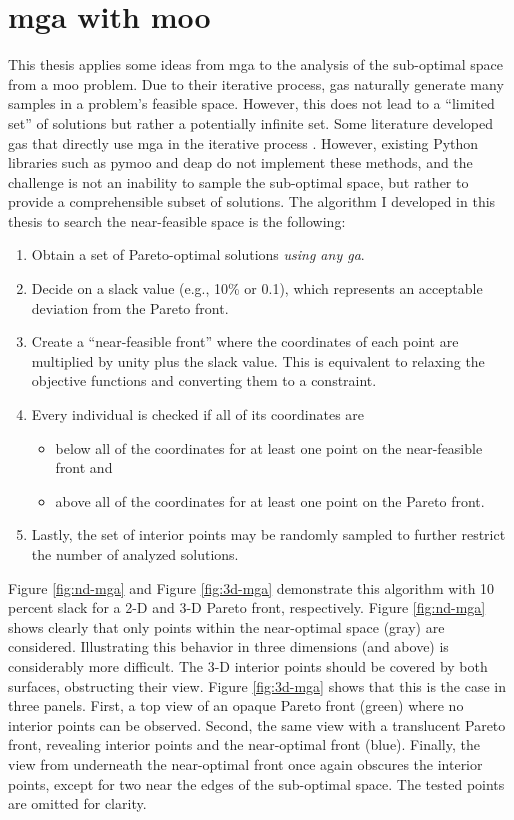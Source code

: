 \section{\acs{mga} with \acl{moo}}
\label{section:mga-moo}

This thesis applies some ideas from \ac{mga} to the analysis of the sub-optimal
space from a \acl{moo} problem. Due to their iterative process, \acp{ga}
naturally generate many samples in a problem's feasible space. However, this
does not lead to a ``limited set'' of solutions but rather a potentially
infinite set. Some literature developed \acp{ga} that directly use \ac{mga} in
the iterative process
\cite{zechman_evolutionary_2004,zechman_evolutionary_2013}. However, existing
Python libraries such as \ac{pymoo} and \ac{deap} do not implement these
methods, and the challenge is not an inability to sample the sub-optimal space,
but rather to provide a comprehensible subset of solutions. The algorithm I
developed in this thesis to search the near-feasible space is the following:

\begin{enumerate}
    \item Obtain a set of Pareto-optimal solutions \textit{using any \ac{ga}}.
    \item Decide on a slack value (e.g., 10\% or 0.1), which represents an
    acceptable deviation from the Pareto front.
    \item Create a ``near-feasible front'' where the coordinates of each point
    are multiplied by unity plus the slack value. This is equivalent to relaxing
    the objective functions and converting them to a constraint. 
    \item Every individual is checked if all of its coordinates are
    \begin{itemize}
        \item below all of the coordinates for at least one point on the
        near-feasible front and
        \item above all of the coordinates for at least one point on the Pareto
        front.
    \end{itemize}  
    \item Lastly, the set of interior points may be randomly sampled to further
    restrict the number of analyzed solutions.
\end{enumerate}
\noindent
Figure \ref{fig:nd-mga} and Figure \ref{fig:3d-mga} demonstrate this algorithm
with 10 percent slack for a 2-D and 3-D Pareto front, respectively. Figure
\ref{fig:nd-mga} shows clearly that only points within the near-optimal space
(gray) are considered. Illustrating this behavior in three dimensions (and
above) is considerably more difficult. The 3-D interior points should be covered
by both surfaces, obstructing their view. Figure \ref{fig:3d-mga} shows that
this is the case in three panels. First, a top view of an opaque Pareto front
(green) where no interior points can be observed. Second, the same view with a
translucent Pareto front, revealing interior points and the near-optimal front
(blue). Finally, the view from underneath the near-optimal front once again
obscures the interior points, except for two near the edges of the sub-optimal
space. The tested points are omitted for clarity.
 

